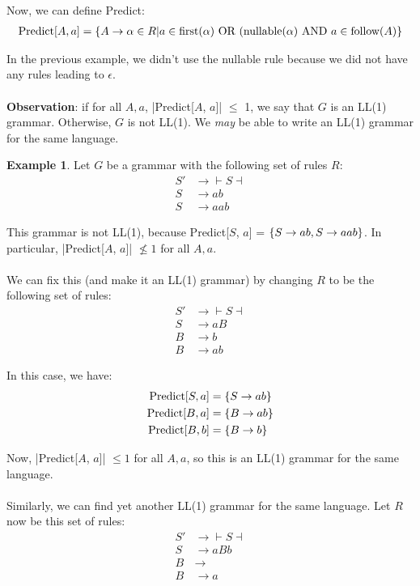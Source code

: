 \documentclass[]{article}
\DeclarePairedDelimiter{\set}{\lbrace}{\rbrace}
\theoremstyle{definition}
\newtheorem{ex}{Example}[section]
\begin{document}
				Now, we can define Predict:
				\begin{align*}
					\text{Predict}[A, a] = \set{A \to \alpha \in R | a \in \text{first}(\alpha) \text{ OR } (\text{nullable}(\alpha) \text{ AND } a \in \text{follow}(A)}
				\end{align*}

				In the previous example, we didn't use the nullable rule because we did not have any rules leading to $\epsilon$.
				\\ \\
				\textbf{Observation}: if for all $A, a$, |Predict[$A$, $a$]| $\le$ 1, we say that $G$ is an LL(1) grammar. Otherwise, $G$ is not LL(1). We \emph{may} be able to write an LL(1) grammar for the same language.
				\begin{ex}
					Let $G$ be a grammar with the following set of rules $R$:
					\begin{align*}
						S' &\to{} \vdash S \dashv \\
						S &\to ab \\
						S &\to aab
					\end{align*}

					This grammar is not LL(1), because Predict[$S$, $a$] = $\set{S \to ab, S \to aab}$. In particular, |Predict[$A$, $a$]| $\not \le 1$ for all $A, a$.
					\\ \\
					We can fix this (and make it an LL(1) grammar) by changing $R$ to be the following set of rules:
					\begin{align*}
						S' &\to{} \vdash S \dashv \\
						S &\to aB \\
						B &\to b \\
						B &\to ab
					\end{align*}

					In this case, we have:
					\begin{align*}
						\text{Predict}[S, a] &= \set{S \to ab} \\
						\text{Predict}[B, a] &= \set{B \to ab} \\
						\text{Predict}[B, b] &= \set{B \to b}
					\end{align*}

					Now, |Predict[$A$, $a$]| $\le 1$ for all $A, a$, so this is an LL(1) grammar for the same language.
					\\ \\
					Similarly, we can find yet another LL(1) grammar for the same language. Let $R$ now be this set of rules:
					\begin{align*}
						S' &\to{} \vdash S \dashv \\
						S &\to aBb \\
						B &\to \\
						B &\to a
					\end{align*}


\end{ex}
\end{document}
